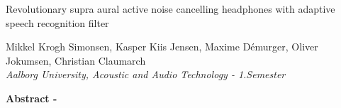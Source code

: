 
\begin{center}
\begin{huge}
Revolutionary supra aural active noise cancelling headphones with adaptive speech recognition filter
\end{huge}

\vspace{5mm}
Mikkel Krogh Simonsen, Kasper Kiis Jensen, Maxime Démurger, Oliver Jokumsen, Christian Claumarch
\\
\textit{Aalborg University, Acoustic and Audio Technology - 1.Semester}


\vspace{5mm}

\textbf{Abstract -} \lipsum[2]



\end{center}